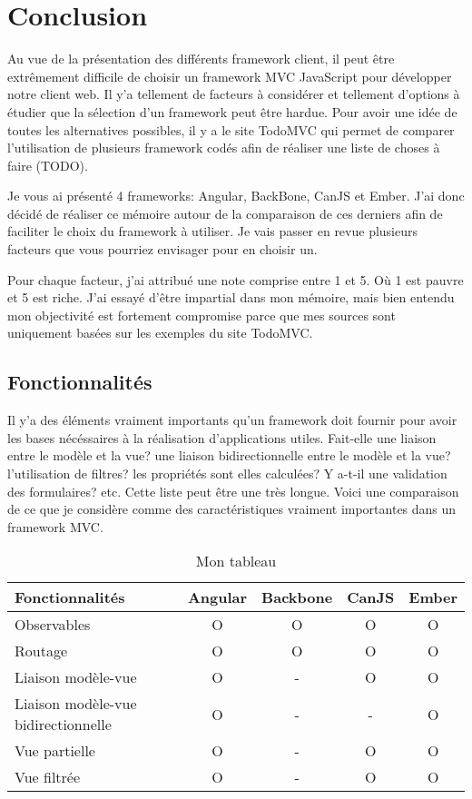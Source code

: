 \section{Conclusion}
\label{ch:conclusion client}

Au vue de la présentation des différents framework client, il peut être extrêmement difficile de choisir un framework MVC JavaScript pour développer notre client web. Il y’a tellement de facteurs à considérer et tellement d’options à étudier que la sélection d’un framework peut être hardue. Pour avoir une idée de toutes les alternatives possibles, il y a le site TodoMVC qui permet de comparer l’utilisation de plusieurs framework codés afin de réaliser une liste de choses à faire (TODO).

Je vous ai présenté 4 frameworks: Angular, BackBone, CanJS et Ember. J’ai donc décidé de réaliser ce mémoire autour de la comparaison de ces derniers afin de faciliter le choix du framework à utiliser. Je vais passer en revue plusieurs facteurs que vous pourriez envisager pour en choisir un.

Pour chaque facteur, j’ai attribué une note comprise entre 1 et 5. Où 1 est pauvre et 5 est riche. J’ai essayé d’être impartial dans mon mémoire, mais bien entendu mon objectivité est fortement compromise parce que mes sources sont uniquement basées sur les exemples du site TodoMVC.


\subsection{Fonctionnalités}

Il y’a des éléments vraiment importants qu’un framework doit fournir pour avoir les bases nécéssaires à la réalisation d’applications utiles. Fait-elle une liaison entre le modèle et la vue? une liaison bidirectionnelle entre le modèle et la vue? l’utilisation de filtres? les propriétés sont elles calculées? Y a-t-il une validation des formulaires? etc. Cette liste peut être une très longue. Voici une comparaison de ce que je considère comme des caractéristiques vraiment importantes dans un framework MVC.

\begin{table}
\begin{center}
\begin{tabular}{|l|c|c|c|c|}
  \hline 
  Fonctionnalités & Angular & Backbone & CanJS & Ember \\
  \hline 
  Observables & O & O & O & O \\
  \hline 
  Routage & O & O & O & O \\
  \hline 
  Liaison modèle-vue & O & - & O & O \\
  \hline 
  Liaison modèle-vue bidirectionnelle & O & - & - & O \\
  \hline 
  Vue partielle & O & - & O & O \\
  \hline 
  Vue filtrée & O & - & O & O \\
  \hline
\end{tabular}
\end{center}
\caption{Mon tableau}
\end{table}

